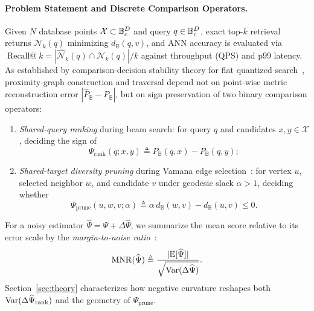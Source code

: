 \paragraph{Problem Statement and Discrete Comparison Operators.}
Given $N$ database points $\mathcal{X} \subset \mathbb{B}_c^D$ and query $q \in \mathbb{B}_c^D$, exact top-$k$ retrieval returns $\mathcal{N}_k(q)$ minimizing $d_{\mathbb{B}}(q, v)$, and {ANN} accuracy is evaluated via $\operatorname{Recall@}k = |\widehat{\mathcal{N}}_k(q) \cap \mathcal{N}_k(q)| / k$ against throughput ({QPS}) and p99 latency.
As established by comparison-decision stability theory for flat quantized search~\cite{xiao2026decisions}, proximity-graph construction and traversal depend not on point-wise metric reconstruction error $|\widehat{P}_{\mathbb{B}} - P_{\mathbb{B}}|$, but on sign preservation of two binary comparison operators:
\begin{enumerate}
  \item \emph{Shared-query ranking} during beam search: for query $q$ and candidates $x, y \in \mathcal{X}$, deciding the sign of
  \begin{equation}
    \Psi_{\mathrm{rank}}(q; x, y) \triangleq P_{\mathbb{B}}(q, x) - P_{\mathbb{B}}(q, y);
    \label{eq:psi_rank}
  \end{equation}
  \item \emph{Shared-target diversity pruning} during {Vamana} edge selection~\cite{subramanya2019diskann}: for vertex $u$, selected neighbor $w$, and candidate $v$ under geodesic slack $\alpha > 1$, deciding whether
  \begin{equation}
    \Psi_{\mathrm{prune}}(u, w, v; \alpha) \triangleq \alpha\,d_{\mathbb{B}}(w, v) - d_{\mathbb{B}}(u, v) \le 0.
    \label{eq:psi_prune}
  \end{equation}
\end{enumerate}
For a noisy estimator $\widehat{\Psi} = \Psi + \Delta\widehat{\Psi}$, we summarize the mean score relative to its error scale by the \emph{margin-to-noise ratio}~\cite{xiao2026decisions}:
\begin{equation}
  \mathrm{MNR}(\widehat{\Psi}) \triangleq \frac{|\mathbb{E}[\widehat{\Psi}]|}{\sqrt{\operatorname{Var}(\Delta\widehat{\Psi})}}.
  \label{eq:mnr_def}
\end{equation}
Section~\ref{sec:theory} characterizes how negative curvature reshapes both $\operatorname{Var}(\Delta\widehat{\Psi}_{\mathrm{rank}})$ and the geometry of $\Psi_{\mathrm{prune}}$.
